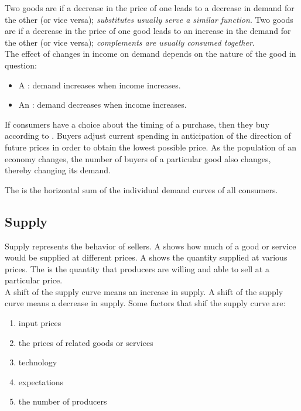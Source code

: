 \documentclass{article}
\begin{document}
Two goods are  if a decrease in the price of one leads to a decrease in demand for the other (or vice versa); \emph{substitutes usually serve a similar function}. Two goods are  if a decrease in the price of one good leads to an increase in the demand for the other (or vice versa); \emph{complements are usually consumed together}. \\ 

The effect of changes in income on demand depends on the nature of the good in question:
\begin{itemize}
  \item A : demand increases when income increases. 
  \item An : demand decreases when income increases.
\end{itemize}

If consumers have a choice about the timing of a purchase, then they buy according to . Buyers adjust current spending in anticipation of the direction of future prices in order to obtain the lowest possible price. As the population of an economy changes, the number of buyers of a particular good also changes, thereby changing its demand. 

The  is the horizontal sum of the individual demand curves of all consumers. 

\subsection{Supply}

Supply represents the behavior of sellers. A  shows how much of a good or service would be supplied at different prices. A  shows the quantity supplied at various prices. The  is the quantity that producers are willing and able to sell at a particular price. \\ 

A  shift of the supply curve means an increase in supply. A  shift of the supply curve means a decrease in supply. Some factors that shif the supply curve are: 
\begin{enumerate}
  \item input prices 
  \item the prices of related goods or services 
  \item technology 
  \item expectations
  \item the number of producers
\end{enumerate}
\end{document}
